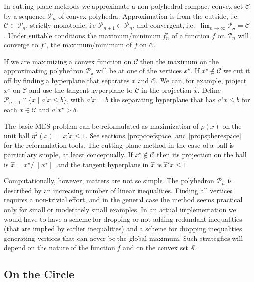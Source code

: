 \documentclass[
  12pt,
]{book}
\theoremstyle{definition}
\theoremstyle{definition}
\theoremstyle{definition}
\theoremstyle{definition}
\theoremstyle{remark}
\begin{document}
In cutting plane methods we approximate a non-polyhedral compact convex set \(\mathcal{C}\) by a sequence \(\mathcal{P}_n\) of convex polyhedra. Approximation is from the outside, i.e.~\(\mathcal{C}\subset\mathcal{P}_n\), strictly monotonic, i.e \(\mathcal{P}_{n+1}\subset\mathcal{P}_n\), and convergent, i.e.~\(\lim_{n\rightarrow\infty}\mathcal{P_n}=\mathcal{C}\). Under suitable conditions the maximum/minimum \(f^\star_n\) of a function \(f\) on \(\mathcal{P}_n\) will converge to \(f^\star\), the maximum/minimum of \(f\) on \(\mathcal{C}\).

If we are maximizing a convex function on \(\mathcal{C}\) then the maximum on the approximating polyhedron \(\mathcal{P}_n\) will be at one of the vertices \(x^\star\). If
\(x^\star\not\in\mathcal{C}\) we cut it off by finding a hyperplane that separates \(x\)
and \(\mathcal{C}\). We can, for example, project \(x^\star\) on \(\mathcal{C}\) and use the tangent hyperplane to \(\mathcal{C}\) in the projection \(\hat x\). Define \(\mathcal{P}_{n+1}\cap\{x\mid a'x\leq b\}\), with \(a'x=b\) the separating hyperplane that has \(a'x\leq b\) for each \(x\in\mathcal{C}\) and \(a'x^\star > b\).

The basic MDS problem can be reformulated as maximization of \(\rho(x)\) on the unit ball \(\eta^2(x)=x'x\leq 1\). See sections \ref{propcoefspace} and \ref{propspherespace} for the reformulation tools. The cutting plane method in the case of a ball is particulary simple, at least conceptually. If \(x^\star\not\in\mathcal{C}\) then its projection on the ball is \(\hat x=x^\star/\|x^\star\|\) and the tangent hyperplane in \(\hat x\) is \(\hat x'x\leq 1\).

Computationally, however, matters are not so simple. The polyhedron \(\mathcal{P}_n\) is described by an increasing number of linear inequalities.
Finding all vertices requires a non-trivial effort, and in the general case the method seems practical only for small or moderately small examples. In an actual implementation we would have to have a scheme for dropping or not adding redundant inequalities (that are implied by earlier inequalities) and a scheme for dropping inequalities generating vertices that can never be the global maximum. Such strategfies will depend on the nature of the function \(f\) and on the convex set \(\mathcal{S}\).

\hypertarget{globalcircle}{%
\subsection{On the Circle}\label{globalcircle}}
\end{document}
